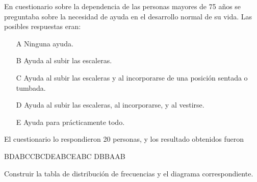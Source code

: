 {En cuestionario sobre la dependencia de las personas mayores de 75 años se preguntaba sobre la necesidad de ayuda en el desarrollo normal de su vida. Las posibles respuestas eran:
\begin{enumerate}
\item[A] Ninguna ayuda.
\item[B] Ayuda al subir las escaleras.
\item[C] Ayuda al subir las escaleras y al incorporarse de una posición sentada o tumbada.
\item[D] Ayuda al subir las escaleras, al incorporarse, y al vestirse.
\item[E] Ayuda para prácticamente todo.
\end{enumerate}
El cuestionario lo respondieron 20 personas, y los resultado obtenidos fueron
\begin{center}
B\quad D\quad A\quad B\quad C\quad C\quad B\quad C\quad D\quad E\quad A\quad B\quad C\quad E\quad A\quad B\quad C\quad
D\quad B\quad B\quad A\quad A\quad B 
\end{center}
Construir la tabla de distribución de frecuencias y el diagrama correspondiente. 
}
{
}
{}


